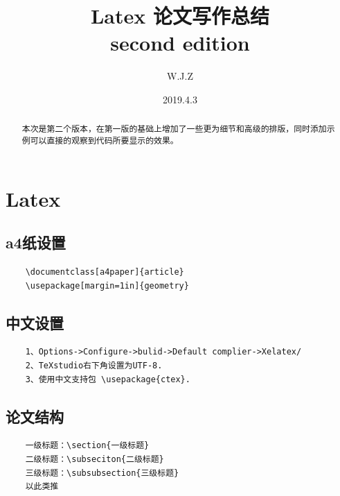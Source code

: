 \documentclass[a4paper]{article}
\title{{Latex 论文写作总结}\\
{ \large second edition} }
\author{W.J.Z}
\date{2019.4.3}
\begin{document}
	\maketitle
	\begin{abstract}
		本次是第二个版本，在第一版的基础上增加了一些更为细节和高级的排版，同时添加示例可以直接的观察到代码所要显示的效果。
	\end{abstract}
	\section{Latex}
	\subsection{a4纸设置}
	\begin{lstlisting}
	\documentclass[a4paper]{article}
	\usepackage[margin=1in]{geometry}
	\end{lstlisting}
	\subsection{中文设置}
	\begin{lstlisting}
	1、Options->Configure->bulid->Default complier->Xelatex/
	2、TeXstudio右下角设置为UTF-8.
	3、使用中文支持包 \usepackage{ctex}.
	\end{lstlisting}
	\subsection{论文结构}
	\begin{lstlisting}
	一级标题：\section{一级标题}
	二级标题：\subseciton{二级标题}
	三级标题：\subsubsection{三级标题}
	以此类推
	\end{lstlisting}
\end{document}
